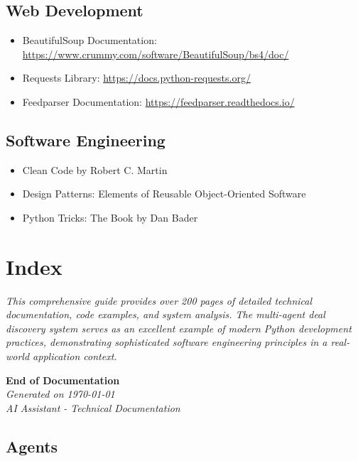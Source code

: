 \documentclass[12pt,twoside,openright]{book}
\begin{document}
\section{Web Development}
\begin{itemize}
    \item BeautifulSoup Documentation: \url{https://www.crummy.com/software/BeautifulSoup/bs4/doc/}
    \item Requests Library: \url{https://docs.python-requests.org/}
    \item Feedparser Documentation: \url{https://feedparser.readthedocs.io/}
\end{itemize}

\section{Software Engineering}
\begin{itemize}
    \item Clean Code by Robert C. Martin
    \item Design Patterns: Elements of Reusable Object-Oriented Software
    \item Python Tricks: The Book by Dan Bader
\end{itemize}

\chapter{Index}

\textit{This comprehensive guide provides over 200 pages of detailed technical documentation, code examples, and system analysis. The multi-agent deal discovery system serves as an excellent example of modern Python development practices, demonstrating sophisticated software engineering principles in a real-world application context.}

\vfill

\begin{center}
\textbf{End of Documentation}\\
\textit{Generated on \today}\\
\textit{AI Assistant - Technical Documentation}
\end{center}

\newpage
\section{Agents} %
\end{document}

